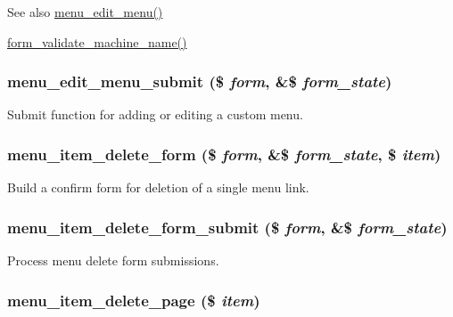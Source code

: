\begin{DoxySeeAlso}{See also}
\hyperlink{menu_8admin_8inc_a7b2df6cf690f6d62f9521358229786b3}{menu\_\-edit\_\-menu()} 

\hyperlink{group__form__api_ga22965a0e68fef7765e0eb2c475440e55}{form\_\-validate\_\-machine\_\-name()} 
\end{DoxySeeAlso}
\hypertarget{menu_8admin_8inc_a71326ad2f1a2c791cc3e6081a9d28d26}{
\subsubsection[{menu\_\-edit\_\-menu\_\-submit}]{\setlength{\rightskip}{0pt plus 5cm}menu\_\-edit\_\-menu\_\-submit (\$ {\em form}, \/  \&\$ {\em form\_\-state})}}
\label{menu_8admin_8inc_a71326ad2f1a2c791cc3e6081a9d28d26}
Submit function for adding or editing a custom menu. \hypertarget{menu_8admin_8inc_afd1809bec6c30cd2223bdc981aa55f49}{
\subsubsection[{menu\_\-item\_\-delete\_\-form}]{\setlength{\rightskip}{0pt plus 5cm}menu\_\-item\_\-delete\_\-form (\$ {\em form}, \/  \&\$ {\em form\_\-state}, \/  \$ {\em item})}}
\label{menu_8admin_8inc_afd1809bec6c30cd2223bdc981aa55f49}
Build a confirm form for deletion of a single menu link. \hypertarget{menu_8admin_8inc_a68d6f7a22501af5a1e4864996008c0b7}{
\subsubsection[{menu\_\-item\_\-delete\_\-form\_\-submit}]{\setlength{\rightskip}{0pt plus 5cm}menu\_\-item\_\-delete\_\-form\_\-submit (\$ {\em form}, \/  \&\$ {\em form\_\-state})}}
\label{menu_8admin_8inc_a68d6f7a22501af5a1e4864996008c0b7}
Process menu delete form submissions. \hypertarget{menu_8admin_8inc_a2aaea348b520cd9c44792983f1749cfa}{
\subsubsection[{menu\_\-item\_\-delete\_\-page}]{\setlength{\rightskip}{0pt plus 5cm}menu\_\-item\_\-delete\_\-page (\$ {\em item})}}
